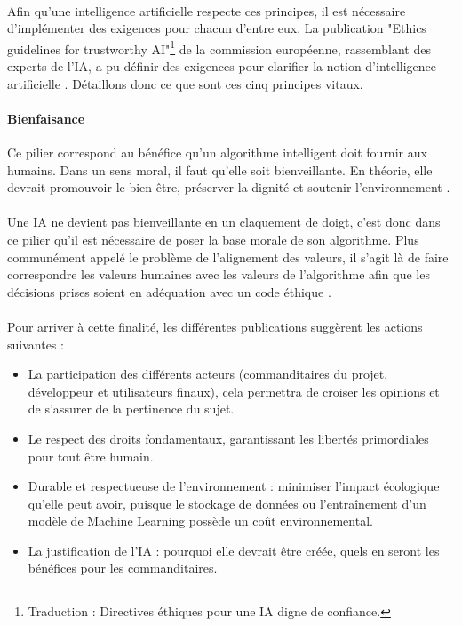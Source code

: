 \documentclass[10pt, french, a4paper]{article}
\begin{document}
\paragraph{}
Afin qu'une intelligence artificielle respecte ces principes, il est nécessaire d'implémenter des exigences pour chacun d'entre eux. La publication "Ethics guidelines for trustworthy AI"\footnote{Traduction : Directives éthiques pour une IA digne de confiance.} de la commission européenne, rassemblant des experts de l'IA, a pu définir des exigences pour clarifier la notion d'intelligence artificielle \cite{european_commission_ethics_2019}. Détaillons donc ce que sont ces cinq principes vitaux.

\paragraph{Bienfaisance}
Ce pilier correspond au bénéfice qu'un algorithme intelligent doit fournir aux humains. Dans un sens moral, il faut qu'elle soit bienveillante. En théorie, elle devrait promouvoir le bien-être, préserver la dignité et soutenir l'environnement \citep{floridi_unified_2019}.

\paragraph{}
Une IA ne devient pas bienveillante en un claquement de doigt, c'est donc dans ce pilier qu'il est nécessaire de poser la base morale de son algorithme. Plus communément appelé le problème de l'alignement des valeurs, il s'agit là de faire correspondre les valeurs humaines avec les valeurs de l'algorithme afin que les décisions prises soient en adéquation avec un code éthique \citep{russell_interview_2019}. 

\paragraph{}
Pour arriver à cette finalité, les différentes publications suggèrent les actions suivantes : 

\begin{itemize}
\item La participation des différents acteurs (commanditaires du projet, développeur et utilisateurs finaux), cela permettra de croiser les opinions et de s'assurer de la pertinence du sujet. 
\item Le respect des droits fondamentaux, garantissant les libertés primordiales pour tout être humain.
\item Durable et respectueuse de l'environnement : minimiser l'impact écologique qu'elle peut avoir, puisque le stockage de données ou l'entraînement d'un modèle de Machine Learning possède un coût environnemental.
\item La justification de l'IA : pourquoi elle devrait être créée, quels en seront les bénéfices pour les commanditaires.
\end{itemize}
\end{document}
